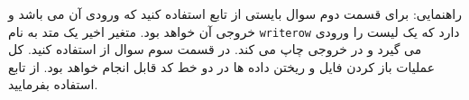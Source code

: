 \documentclass[oneside]{article}
\begin{document}
\begin{enumerate}
راهنمایی: برای قسمت دوم سوال بایستی از تابع 
استفاده کنید که ورودی آن 
می باشد و خروجی آن 
خواهد بود. متغیر اخیر یک متد به نام 
\texttt{writerow}
دارد که یک لیست را ورودی می گیرد و در خروجی چاپ می کند. در قسمت سوم سوال از
استفاده کنید. کل عملیات باز کردن فایل و ریختن داده ها در دو خط کد قابل انجام خواهد بود. از تابع 
استفاده بفرمایید.
\end{enumerate}

\end{document}
